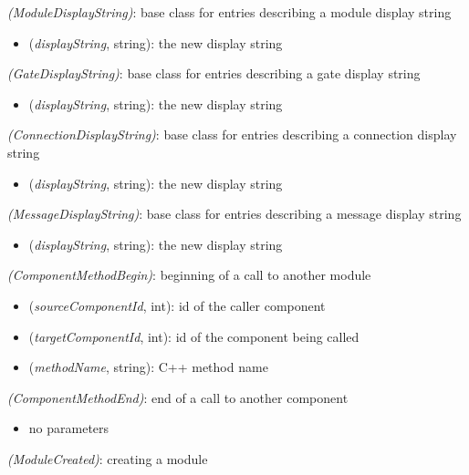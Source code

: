  \textit{(ModuleDisplayString)}: base class for entries describing a module display string

\begin{itemize}
  \item {} (\textit{displayString}, string): the new display string
\end{itemize}

 \textit{(GateDisplayString)}: base class for entries describing a gate display string

\begin{itemize}
  \item {} (\textit{displayString}, string): the new display string
\end{itemize}

 \textit{(ConnectionDisplayString)}: base class for entries describing a connection display string

\begin{itemize}
  \item {} (\textit{displayString}, string): the new display string
\end{itemize}

 \textit{(MessageDisplayString)}: base class for entries describing a message display string

\begin{itemize}
  \item {} (\textit{displayString}, string): the new display string
\end{itemize}

 \textit{(ComponentMethodBegin)}: beginning of a call to another module

\begin{itemize}
  \item {} (\textit{sourceComponentId}, int): id of the caller component
  \item {} (\textit{targetComponentId}, int): id of the component being called
  \item {} (\textit{methodName}, string): C++ method name
\end{itemize}

 \textit{(ComponentMethodEnd)}: end of a call to another component

\begin{itemize}
  \item no parameters
\end{itemize}

 \textit{(ModuleCreated)}: creating a module

